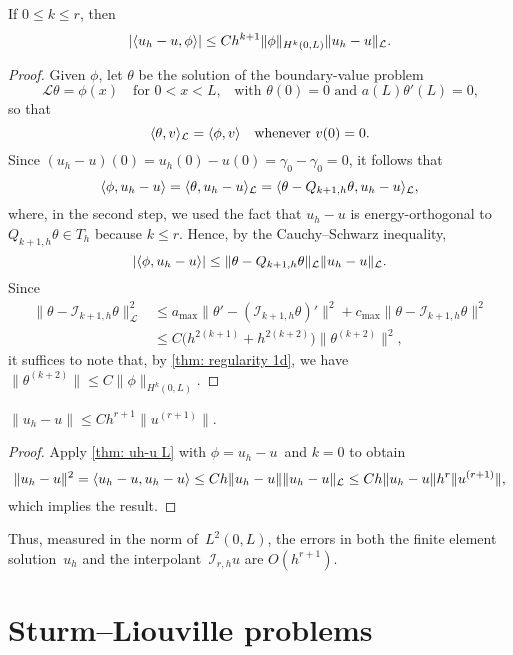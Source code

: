 \begin{theorem}
If $0\le k\le r$, then
\[
|\langle u_h-u,\phi\rangle|\le Ch^{k+1}\|\phi\|_{H^k(0,L)}\|u_h-u\|_{\mathcal{L}}.
\]
\end{theorem}
\begin{proof}
Given $\phi$, let $\theta$ be the solution of the boundary-value problem
\[
\mathcal{L}\theta=\phi(x)\quad\text{for $0<x<L$,}
	\quad\text{with $\theta(0)=0$ and $a(L)\theta'(L)=0$,}
\]
so that
\[
\langle\theta,v\rangle_{\mathcal{L}}=\langle\phi,v\rangle\quad\text{whenever $v(0)=0$.}
\]
Since $(u_h-u)(0)=u_h(0)-u(0)=\gamma_0-\gamma_0=0$, it follows that
\[
\langle\phi,u_h-u\rangle=\langle\theta,u_h-u\rangle_{\mathcal{L}}
	=\langle\theta-Q_{k+1,h}\theta,u_h-u\rangle_{\mathcal{L}},
\]
where, in the second step, we used the fact that $u_h-u$ is energy-orthogonal
to $Q_{k+1,h}\theta\in T_h$ because $k\le r$.  Hence, by the Cauchy--Schwarz 
inequality,
\[
|\langle\phi,u_h-u\rangle|\le\|\theta-Q_{k+1,h}\theta\|_{\mathcal{L}}
	\|u_h-u\|_{\mathcal{L}}.
\]
Since
\begin{align*}
\|\theta-\mathcal{I}_{k+1,h}\theta\|_{\mathcal{L}}^2
	&\le a_{\max}\|\theta'-(\mathcal{I}_{k+1,h}\theta)'\|^2
	+c_{\max}\|\theta-\mathcal{I}_{k+1,h}\theta\|^2\\
	&\le C\bigl(h^{2(k+1)}+h^{2(k+2)})\|\theta^{(k+2)}\|^2,
\end{align*}
it suffices to note that, by \cref{thm: regularity 1d}, we have
$\|\theta^{(k+2)}\|\le C\|\phi\|_{H^k(0,L)}$.  
\end{proof}

\begin{corollary}\label{cor: uh L2 error}
$\|u_h-u\|\le Ch^{r+1}\|u^{(r+1)}\|$.
\end{corollary}
\begin{proof}
Apply \cref{thm: uh-u L} with $\phi=u_h-u$~and $k=0$ to obtain
\[
\|u_h-u\|^2=\langle u_h-u,u_h-u\rangle\le Ch\|u_h-u\|\|u_h-u\|_{\mathcal{L}}
	\le Ch\|u_h-u\|h^r\|u^{(r+1)}\|,
\]
which implies the result.
\end{proof}

Thus, measured in the norm of~$L^2(0,L)$, the errors in both the finite element
solution~$u_h$ and the interpolant~$\mathcal{I}_{r,h}u$ are $O(h^{r+1})$.

\section{Sturm--Liouville problems}\label{sec: Sturm-Liouville}

